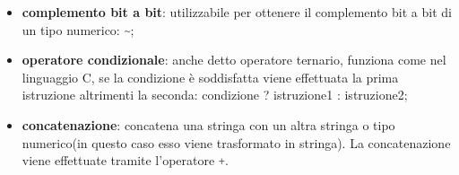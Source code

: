 \documentclass{subfile}
\begin{document}
\begin{itemize}
        \item \textbf{complemento bit a bit}: utilizzabile per ottenere il complemento bit a bit di un tipo numerico:
        \lstinline[language = java]{~};
        \item \textbf{operatore condizionale}: anche detto operatore ternario, funziona come nel linguaggio C, se la condizione è 
        soddisfatta viene effettuata la prima istruzione altrimenti la seconda: 
        condizione ? istruzione1 : istruzione2;
        \item \textbf{concatenazione}: concatena una stringa con un altra stringa o tipo numerico(in questo caso esso viene trasformato 
        in stringa). La concatenazione viene effettuate tramite l'operatore \lstinline[language = java]{+}.
        \end{itemize}
\end{document}
